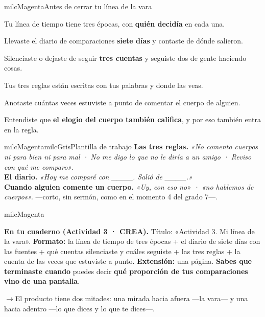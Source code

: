 \documentclass[11pt,letterpaper]{article}
\newcommand{\puente}[1]{%
  \begin{puentebox}%
    \textcolor{milcGradeDark}{$\rightarrow$}\hspace{2mm}#1%
  \end{puentebox}%
}
\begin{document}
\begin{drawbox}{milcMagenta}{Antes de cerrar tu línea de la vara}
\begin{checklista}
\item Tu línea de tiempo tiene tres épocas, con \textbf{quién decidía} en cada una.
\item Llevaste el diario de comparaciones \textbf{siete días} y contaste de dónde salieron.
\item Silenciaste o dejaste de seguir \textbf{tres cuentas} y seguiste dos de gente haciendo cosas.
\item Tus tres reglas están escritas con tus palabras y donde las veas.
\item Anotaste cuántas veces estuviste a punto de comentar el cuerpo de alguien.
\item Entendiste que \textbf{el elogio del cuerpo también califica}, y por eso también entra en la regla.
\end{checklista}
\end{drawbox}

\begin{softbox}{milcMagenta}{milcGris}{Plantilla de trabajo}
\textbf{Las tres reglas.} \emph{«No comento cuerpos ni para bien ni para mal · No me digo lo que no le diría a un amigo · Reviso con qué me comparo».} \\[1mm]
\textbf{El diario.} \emph{«Hoy me comparé con \_\_\_\_. Salió de \_\_\_\_.»} \\[1mm]
\textbf{Cuando alguien comente un cuerpo.} \emph{«Uy, con eso no» · «no hablemos de cuerpos».} ---corto, sin sermón, como en el momento 4 del grado 7---.
\end{softbox}

\begin{infoband}{milcMagenta}


\textbf{En tu cuaderno (Actividad 3 · CREA).} Título: «Actividad 3. Mi línea de la vara». \textbf{Formato:} la línea de tiempo de tres épocas + el diario de siete días con las fuentes + qué cuentas silenciaste y cuáles seguiste + las tres reglas + la cuenta de las veces que estuviste a punto. \textbf{Extensión:} una página. \textbf{Sabes que terminaste cuando} puedes decir \textbf{qué proporción de tus comparaciones vino de una pantalla}.
\end{infoband}

\puente{El producto tiene dos mitades: una mirada hacia afuera ---la vara--- y una hacia adentro ---lo que dices y lo que te dices---.}
\end{document}
